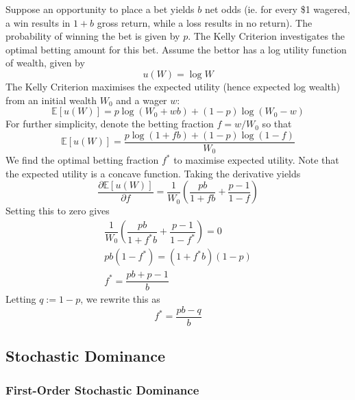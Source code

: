 \documentclass[11pt]{report} %
\begin{document}
Suppose an opportunity to place a bet yields $b$ net odds (ie. for every \$1 wagered, a win results in $1 + b$ gross return, while a loss results in no return). The probability of winning the bet is given by $p$. The Kelly Criterion investigates the optimal betting amount for this bet. Assume the bettor has a log utility function of wealth, given by
\begin{equation}
u\left(W\right) = \log W
\end{equation}
The Kelly Criterion maximises the expected utility (hence expected log wealth) from an initial wealth $W_{0}$ and a wager $w$:
\begin{equation}
\mathbb{E}\left[u\left(W\right)\right] = p\log\left(W_{0} + wb\right) + \left(1 - p\right)\log\left(W_{0} - w\right)
\end{equation}
For further simplicity, denote the betting fraction $f = w/W_{0}$ so that
\begin{equation}
\mathbb{E}\left[u\left(W\right)\right] = \dfrac{p\log\left(1 + fb\right) + \left(1 - p\right)\log\left(1 - f\right)}{W_{0}}
\end{equation}
We find the optimal betting fraction $f^{*}$ to maximise expected utility. Note that the expected utility is a concave function. Taking the derivative yields
\begin{equation}
\dfrac{\partial \mathbb{E}\left[u\left(W\right)\right]}{\partial f} = \dfrac{1}{W_{0}}\left(\dfrac{pb}{1 + fb} + \dfrac{p - 1}{1 - f}\right)
\end{equation}
Setting this to zero gives
\begin{gather}
\dfrac{1}{W_{0}}\left(\dfrac{pb}{1 + f^{*}b} + \dfrac{p - 1}{1 - f^{*}}\right) = 0 \\
pb\left(1 - f^{*}\right) = \left(1 + f^{*}b\right)\left(1 - p\right) \\
f^{*} = \dfrac{pb + p - 1}{b}
\end{gather}
Letting $q := 1 - p$, we rewrite this as
\begin{equation}
f^{*} = \dfrac{pb - q}{b}
\end{equation}

\subsection{Stochastic Dominance}

\subsubsection{First-Order Stochastic Dominance}
\end{document}

